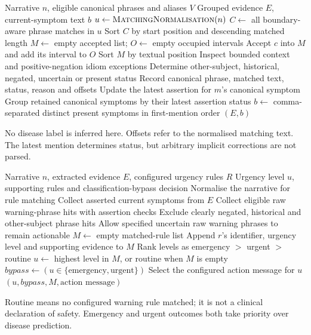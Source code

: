 \documentclass[11pt,a4paper]{article}
\begin{document}
\newpage
\begin{algorithm}[H]
\caption{Extract canonical symptoms and their assertion states}
\label{alg:extract}
\begin{algorithmic}[1]
\Require Narrative $n$, eligible canonical phrases and aliases $V$
\Ensure Grouped evidence $E$, current-symptom text $b$
\State $u\gets\Call{MatchingNormalisation}{n}$
\State $C\gets$ all boundary-aware phrase matches in $u$
\State Sort $C$ by start position and descending matched length
\State $M\gets$ empty accepted list; $O\gets$ empty occupied intervals
    \State Accept $c$ into $M$ and add its interval to $O$
  \EndIf
\EndFor
\State Sort $M$ by textual position
  \State Inspect bounded context and positive-negation idiom exceptions
  \State Determine other-subject, historical, negated, uncertain or present status
  \State Record canonical phrase, matched text, status, reason and offsets
  \State Update the latest assertion for $m$'s canonical symptom
\EndFor
\State Group retained canonical symptoms by their latest assertion status
\State $b\gets$ comma-separated distinct present symptoms in first-mention order
\State \Return $(E,b)$
\end{algorithmic}
\end{algorithm}
No disease label is inferred here. Offsets refer to the normalised matching text.
The latest mention determines status, but arbitrary implicit corrections are not parsed.

\newpage
\begin{algorithm}[H]
\caption{Choose urgency by the highest-priority matching rule}
\label{alg:urgency}
\begin{algorithmic}[1]
\Require Narrative $n$, extracted evidence $E$, configured urgency rules $R$
\Ensure Urgency level $u$, supporting rules and classification-bypass decision
\State Normalise the narrative for rule matching
\State Collect asserted current symptoms from $E$
\State Collect eligible raw warning-phrase hits with assertion checks
\State Exclude clearly negated, historical and other-subject phrase hits
\State Allow specified uncertain raw warning phrases to remain actionable
\State $M\gets$ empty matched-rule list
    \State Append $r$'s identifier, urgency level and supporting evidence to $M$
  \EndIf
\EndFor
\State Rank levels as emergency $>$ urgent $>$ routine
\State $u\gets$ highest level in $M$, or routine when $M$ is empty
\State $bypass\gets(u\in\{\text{emergency},\text{urgent}\})$
\State Select the configured action message for $u$
\State \Return $(u,bypass,M,\text{action message})$
\end{algorithmic}
\end{algorithm}
Routine means no configured warning rule matched; it is not a clinical declaration
of safety. Emergency and urgent outcomes both take priority over disease prediction.
\end{document}
